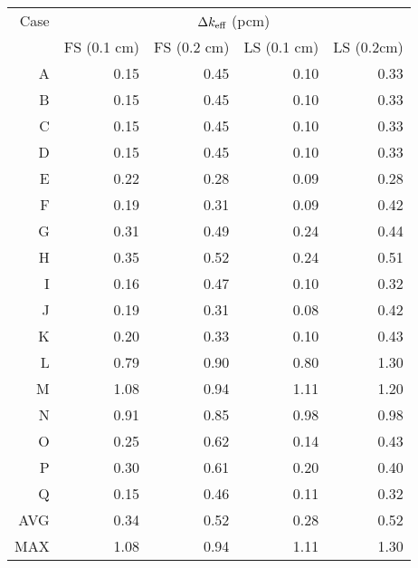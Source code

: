 {{{{\begin{table}[htbp]
          \small
          \begin{tabular}{rrrrr} \toprule
            Case  & \multicolumn{4}{c}{$\Delta k_{\text{eff}}$ (pcm)}\\\cline{2-5}
                  & FS (0.1 cm) & FS (0.2 cm) & LS (0.1 cm) & LS (0.2cm)\\\midrule
            A     & 0.15 & 0.45 & 0.10 & 0.33\\
            B     & 0.15 & 0.45 & 0.10 & 0.33\\
            C     & 0.15 & 0.45 & 0.10 & 0.33\\
            D     & 0.15 & 0.45 & 0.10 & 0.33\\
            E     & 0.22 & 0.28 & 0.09 & 0.28\\
            F     & 0.19 & 0.31 & 0.09 & 0.42\\
            G     & 0.31 & 0.49 & 0.24 & 0.44\\
            H     & 0.35 & 0.52 & 0.24 & 0.51\\
            I     & 0.16 & 0.47 & 0.10 & 0.32\\
            J     & 0.19 & 0.31 & 0.08 & 0.42\\
            K     & 0.20 & 0.33 & 0.10 & 0.43\\
            L     & 0.79 & 0.90 & 0.80 & 1.30\\
            M     & 1.08 & 0.94 & 1.11 & 1.20\\
            N     & 0.91 & 0.85 & 0.98 & 0.98\\
            O     & 0.25 & 0.62 & 0.14 & 0.43\\
            P     & 0.30 & 0.61 & 0.20 & 0.40\\
            Q     & 0.15 & 0.46 & 0.11 & 0.32\\\midrule
            AVG   & 0.34 & 0.52 & 0.28 & 0.52\\
            MAX   & 1.08 & 0.94 & 1.11 & 1.30\\\bottomrule
          \end{tabular}
        \end{table}

}}}}
